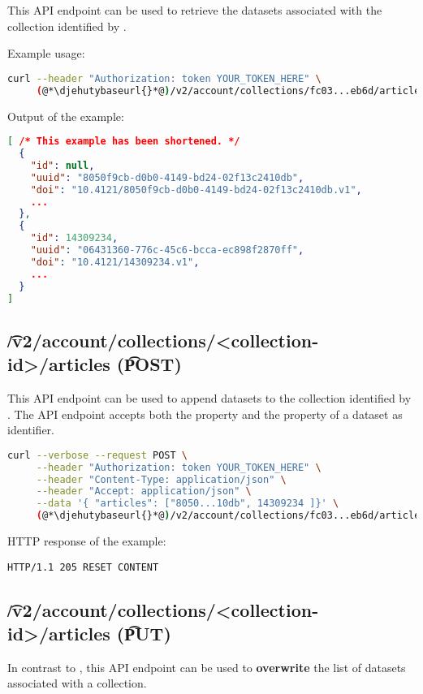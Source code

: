   This API endpoint can be used to retrieve the datasets associated with
  the collection identified by .

  Example usage:
\begin{lstlisting}[language=bash]
curl --header "Authorization: token YOUR_TOKEN_HERE" \
     (@*\djehutybaseurl{}*@)/v2/account/collections/fc03...eb6d/articles | jq
\end{lstlisting}

  Output of the example:
\begin{lstlisting}[language=JSON]
[ /* This example has been shortened. */
  {
    "id": null,
    "uuid": "8050f9cb-d0b0-4149-bd24-02f13c2410db",
    "doi": "10.4121/8050f9cb-d0b0-4149-bd24-02f13c2410db.v1",
    ...
  },
  {
    "id": 14309234,
    "uuid": "06431360-776c-45c6-bcca-ec898f2870ff",
    "doi": "10.4121/14309234.v1",
    ...
  }
]
\end{lstlisting}

\subsection{\t{/v2/account/collections/<collection-id>/articles} (\t{POST})}
\label{sec:v2-account-collection-articles}
  This API endpoint can be used to append datasets to the collection identified
  by \code{collection-id}.  The API endpoint accepts both the \code{id} property
  and the \code{uuid} property of a dataset as identifier.

\begin{lstlisting}[language=bash]
curl --verbose --request POST \
     --header "Authorization: token YOUR_TOKEN_HERE" \
     --header "Content-Type: application/json" \
     --header "Accept: application/json" \
     --data '{ "articles": ["8050...10db", 14309234 ]}' \
     (@*\djehutybaseurl{}*@)/v2/account/collections/fc03...eb6d/articles
\end{lstlisting}

  HTTP response of the example:
\begin{lstlisting}
HTTP/1.1 205 RESET CONTENT
\end{lstlisting}

\subsection{\t{/v2/account/collections/<collection-id>/articles} (\t{PUT})}

  In contrast to , this API endpoint
  can be used to \textbf{overwrite} the list of datasets associated with a
  collection.

